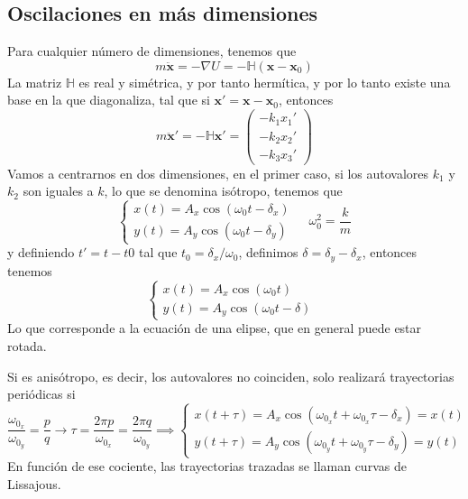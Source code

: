 \subsection{Oscilaciones en más dimensiones}
Para cualquier número de dimensiones, tenemos que
\begin{equation} \label{6.1.1}
    m\ddot{\mathbf{x}} = -\nabla U = -\mathbb{H} (\mathbf{x}-\mathbf{x}_0) 
\end{equation}
La matriz $\mathbb{H}$ es real y simétrica, y por tanto hermítica, y por lo tanto existe una base en la que diagonaliza, tal que si $\mathbf{x}' = \mathbf{x}-\mathbf{x}_0$, entonces
\begin{equation} \label{6.1.1}
    m\ddot{\mathbf{x}}' = -\mathbb{H} \mathbf{x}' = \left(\begin{matrix}
        -k_1 x_1' \\ -k_2 x_2' \\ -k_3 x_3'
    \end{matrix}\right)
\end{equation}
Vamos a centrarnos en dos dimensiones, en el primer caso, si los autovalores $k_1$ y $k_2$ son iguales a $k$, lo que se denomina isótropo, tenemos que
\begin{equation} \label{6.1.1}
    \left\{\begin{matrix}
        x(t) = A_x \cos(\omega_0t - \delta_x) \\
        y(t) = A_y \cos(\omega_0t - \delta_y) 
    \end{matrix}\right. \ \ \ \ \ \omega_0^2 = \frac{k}{m}
\end{equation}
y definiendo $t' = t-t0$ tal que $t_0 = \delta_x/\omega_0$, definimos $\delta = \delta_y-\delta_x$, entonces tenemos
\begin{equation} \label{6.1.1}
    \left\{\begin{matrix}
        x(t) = A_x \cos(\omega_0t) \phantom{--}\\
        y(t) = A_y \cos(\omega_0t - \delta) 
    \end{matrix}\right.
\end{equation}
Lo que corresponde a la ecuación de una elipse, que en general puede estar rotada.

Si es anisótropo, es decir, los autovalores no coinciden, solo realizará trayectorias periódicas si 
\begin{equation} \label{6.1.1}
    \frac{\omega_0_x}{\omega_0_y} = \frac{p}{q} \rightarrow \tau = \frac{2\pi p}{\omega_0_x} = \frac{2\pi q}{\omega_0_y} \implies \left\{\begin{matrix}
        x(t+\tau) = A_x \cos(\omega_0_xt + \omega_0_x \tau -\delta_x) = x(t) \\
        y(t+\tau) = A_y \cos(\omega_0_yt +\omega_0_y \tau- \delta_y) = y(t)
    \end{matrix}\right.
\end{equation}
En función de ese cociente, las trayectorias trazadas se llaman curvas de Lissajous.

